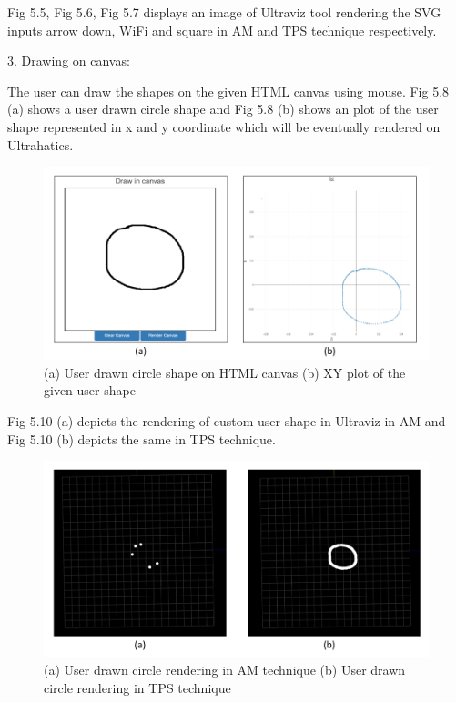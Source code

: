 Fig 5.5, Fig 5.6, Fig 5.7 displays an image of Ultraviz tool rendering the SVG inputs arrow down, WiFi and square in AM and TPS technique respectively.

3. Drawing on canvas:

The user can draw the shapes on the given HTML canvas using mouse. Fig 5.8 (a) shows a user drawn circle shape and Fig 5.8 (b) shows an plot of the user shape represented in x and y coordinate which will be eventually rendered on Ultrahatics.

\begin{figure}[htb]
	\includegraphics[width=\textwidth]{gfx/canvas input.png}
	\caption{(a) User drawn circle shape on HTML canvas (b) XY plot of the given user shape}
	\label{fig:validation:svg_sq_tps}
\end{figure}

Fig 5.10 (a) depicts the rendering of custom user shape in Ultraviz in AM and Fig 5.10 (b) depicts the same in TPS technique.

\begin{figure}[htb]
	\includegraphics[width=\textwidth]{gfx/canvas_uv.png}
	\caption{(a) User drawn circle rendering in AM technique (b) User drawn circle rendering in TPS technique}
	\label{fig:validation:svg_sq_tps}
\end{figure}

